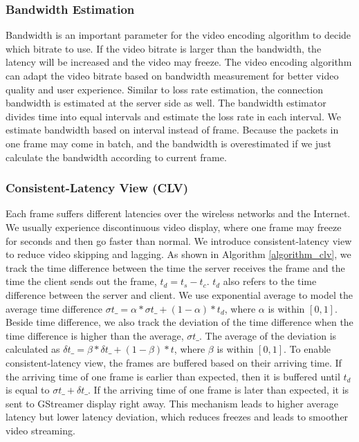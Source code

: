 \subsubsection{Bandwidth Estimation}
\label{sec_bandwidth}

Bandwidth is an important parameter for the video encoding algorithm
to decide which bitrate to use. 
If the video bitrate is larger than the bandwidth, 
the latency will be increased and the video may freeze.  
The video encoding algorithm can adapt the video bitrate
based on bandwidth measurement for better video quality 
and user experience. 
Similar to loss rate estimation, the connection bandwidth is estimated
at the server side as well. 
The bandwidth estimator divides time into equal intervals and 
estimate the loss rate in each interval. 
We estimate bandwidth based on interval instead of frame.
Because the packets in one frame may come in batch, 
and the bandwidth is overestimated if we just calculate
the bandwidth according to current frame. 

\subsubsection{Consistent-Latency View (CLV)}
\label{sec_clv}



Each frame suffers different latencies over the wireless 
networks and the Internet. 
We usually experience discontinuous video display, 
where one frame may freeze for seconds and then go
faster than normal. 
We introduce consistent-latency view to
reduce video skipping and lagging. 
As shown in Algorithm \ref{algorithm_clv}, we track the time difference between 
the time the server receives the frame 
and the time the client sends out
the frame, $t_d = t_s - t_c$. 
$t_d$ also refers to the time difference between the server and client.
We use exponential average to model the average time 
difference $\sigma{t}\_ = \alpha * \sigma{t}\_ + (1 - \alpha) * t_d$, 
where $\alpha$ is within $[0, 1]$. 
Beside time difference, we also track the deviation 
of the time difference when the time difference is 
higher than the average, $\sigma{t}\_$. 
The average of the deviation is calculated as
$\delta{t}\_ = \beta * \delta{t}\_ + (1 - \beta) * t$, 
where $\beta$ is within $[0, 1]$.
To enable consistent-latency view, the frames are buffered based
on their arriving time. 
If the arriving time of one frame is earlier than expected, 
then it is buffered until $t_d$ is equal to $\sigma{t}\_ + \delta{t}\_$. 
If the arriving time of one frame is later than expected, 
it is sent to GStreamer display right away. 
This mechanism leads to higher average latency but 
lower latency deviation,
which reduces freezes and leads to smoother video streaming. 


